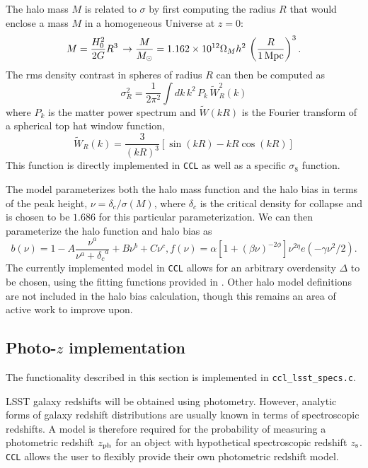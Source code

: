 \documentclass[\docopts]{\docclass}
\begin{document}
The halo mass $M$ is related to $\sigma$ by first computing the radius $R$ that would enclose a mass $M$ in a homogeneous Universe at $z=0$:
\begin{equation}
  M=\frac{H_0^2}{2G}R^3\,\rightarrow \frac{M}{M_\odot}=1.162\times10^{12}\Omega_Mh^2\,\left(\frac{R}{1\,{\rm Mpc}}\right)^3.
\end{equation}
The rms density contrast in spheres of radius $R$ can then be computed as
\begin{equation}
  \sigma_R^2 = \frac{1}{2\pi^2}\int dk\,k^2\,P_k\,\tilde{W}_R^2(k)
  \label{eq:sigR}
\end{equation}
where $P_k$ is the matter power spectrum and $\tilde{W}(kR)$ is the Fourier transform of a spherical top hat window function,
\begin{equation}
\tilde{W}_R(k) = \frac{3}{(kR)^3}[\sin(kR)-kR\cos(kR)]
\end{equation}
%
This function is directly implemented in {\tt CCL} as well as a specific $\sigma_8$ function.

The \citet{Tinker2010} model parameterizes both the halo mass function and the halo bias in terms of the peak height, $\nu = \delta_c / \sigma(M)$, where $\delta_c$ is the critical density for collapse and is chosen to be $1.686$ for this particular parameterization. We can then parameterize the halo function and halo bias as
\begin{equation}
  b(\nu) = 1 - A\frac{\nu^a}{\nu^a + {\delta_c}^a} + B\nu^b+C\nu^c,
  f(\nu) = \alpha[1+(\beta\nu)^{-2\phi}]\nu^{2\eta}e(-\gamma\nu^2/2).
\end{equation}
The currently implemented model in {\tt CCL} allows for an arbitrary overdensity $\Delta$ to be chosen, using the fitting functions provided in \citet{Tinker2010}. Other halo model definitions are not included in the halo bias calculation, though this remains an area of active work to improve upon.

\subsection{Photo-$z$ implementation}
\label{sec:photoz}
The functionality described in this section is implemented in {\tt ccl\_lsst\_specs.c}.

LSST galaxy redshifts will be obtained using photometry. However, analytic forms of galaxy redshift distributions are usually known in terms of spectroscopic redshifts. A model is therefore required for the probability of measuring a photometric redshift $z_{\rm ph}$ for an object with hypothetical spectroscopic redshift $z_{\rm s}$. {\tt CCL} allows the user to flexibly provide their own photometric redshift model.
\end{document}
